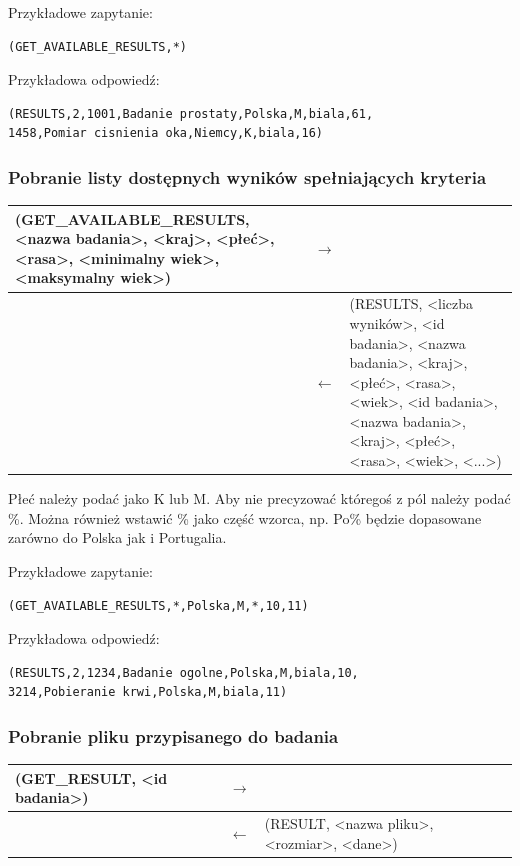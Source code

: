 Przykładowe zapytanie:
\begin{lstlisting}[style=incode]
(GET_AVAILABLE_RESULTS,*)
\end{lstlisting}
Przykładowa odpowiedź:
\begin{lstlisting}[style=incode]
(RESULTS,2,1001,Badanie prostaty,Polska,M,biala,61,
1458,Pomiar cisnienia oka,Niemcy,K,biala,16)
\end{lstlisting}

\subsubsection{Pobranie listy dostępnych wyników spełniających kryteria}

\begin{longtable}{| p{} | p{}| p{} |} 
\hline
(GET\_AVAILABLE\_RESULTS, <nazwa badania>, <kraj>, <płeć>, <rasa>, <minimalny wiek>, <maksymalny wiek>) & $\rightarrow$ &  \\ \hline
 & $\leftarrow$ & (RESULTS, <liczba wyników>, <id badania>, <nazwa badania>, <kraj>, <płeć>, <rasa>, <wiek>, <id badania>, <nazwa badania>, <kraj>, <płeć>, <rasa>, <wiek>, <...>) \\ \hline
\end{longtable}

Płeć należy podać jako K lub M.
Aby nie precyzować któregoś z pól należy podać \%. Można również wstawić \% jako część wzorca, np. Po\% będzie dopasowane zarówno do Polska jak i Portugalia.

Przykładowe zapytanie:
\begin{lstlisting}[style=incode]
(GET_AVAILABLE_RESULTS,*,Polska,M,*,10,11)
\end{lstlisting}
Przykładowa odpowiedź:
\begin{lstlisting}[style=incode]
(RESULTS,2,1234,Badanie ogolne,Polska,M,biala,10,
3214,Pobieranie krwi,Polska,M,biala,11)
\end{lstlisting}

\subsubsection{Pobranie pliku przypisanego do badania}

\begin{longtable}{| p{} | p{}| p{} |} 
\hline
(GET\_RESULT, <id badania>) & $\rightarrow$ &  \\ \hline
 & $\leftarrow$ & (RESULT, <nazwa pliku>, <rozmiar>, <dane>) \\ \hline
\end{longtable}

